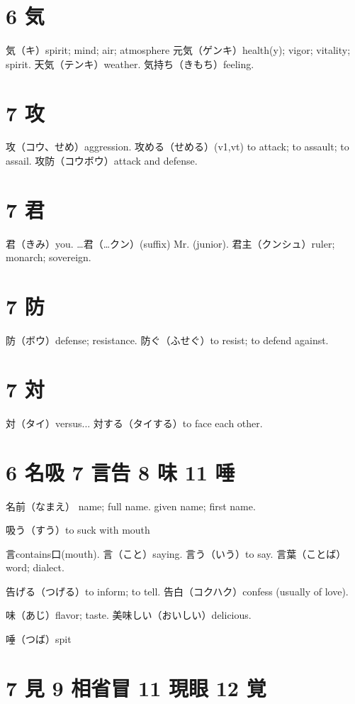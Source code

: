 \section{6 気}

気（キ）spirit; mind; air; atmosphere
元気（ゲンキ）health(y); vigor; vitality; spirit.
天気（テンキ）weather.
気持ち（きもち）feeling.

\section{7 攻}

攻（コウ、せめ）aggression.
攻める（せめる）(v1,vt) to attack; to assault; to assail.
攻防（コウボウ）attack and defense.

\section{7 君}

君（きみ）you.
…君（…クン）(suffix) Mr. (junior).
君主（クンシュ）ruler; monarch; sovereign.

\section{7 防}

防（ボウ）defense; resistance.
防ぐ（ふせぐ）to resist; to defend against.

\section{7 対}

対（タイ）versus...
対する（タイする）to face each other.

\section{6 名吸 7 言告 8 味 11 唾}

名前（なまえ）
name; full name.
given name; first name.

吸う（すう）to suck with mouth

言contains口(mouth).
言（こと）saying.
言う（いう）to say.
言葉（ことば）word; dialect.

告げる（つげる）to inform; to tell.
告白（コクハク）confess (usually of love).

味（あじ）flavor; taste.
美味しい（おいしい）delicious.

唾（つば）spit

\section{7 見 9 相省冒 11 現眼 12 覚}

